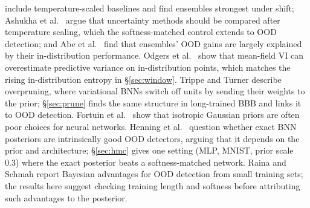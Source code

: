 \documentclass[11pt]{article}
\begin{document}
\citep{ovadia2019can} include temperature-scaled baselines and find ensembles
strongest under shift; Ashukha et al.\ \citep{ashukha2020pitfalls} argue that
uncertainty methods should be compared after temperature scaling, which the
softness-matched control extends to OOD detection; and Abe et al.\
\citep{abe2022deep} find that ensembles' OOD gains are largely explained by
their in-distribution performance. Odgers et al.\ \citep{odgers2026gaussian} show that mean-field VI can
overestimate predictive variance on in-distribution points, which matches the
rising in-distribution entropy in \S\ref{sec:window}. Trippe and Turner
\citep{trippe2018overpruning} describe overpruning, where variational BNNs
switch off units by sending their weights to the prior; \S\ref{sec:prune}
finds the same structure in long-trained BBB and links it to OOD detection. Fortuin et al.\
\citep{fortuin2022priors} show that isotropic Gaussian priors are often poor
choices for neural networks. Henning et al.\ \citep{henning2021bayesian} question
whether exact BNN posteriors are intrinsically good OOD detectors, arguing that
it depends on the prior and architecture; \S\ref{sec:hmc} gives one setting
(MLP, MNIST, prior scale 0.3) where the exact posterior beats a
softness-matched network. Raina and
Schmah \citep{raina2025ood} report Bayesian advantages for OOD detection from
small training sets; the results here suggest checking training length and
softness before attributing such advantages to the posterior.
\end{document}

